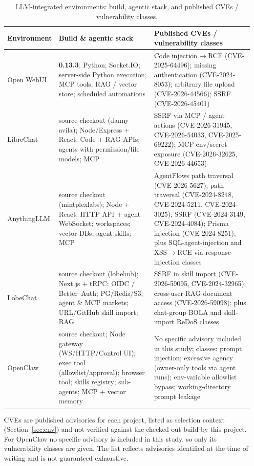 \documentclass[11pt,a4paper]{article}
\begin{document}
\begin{table}[htbp]\centering\footnotesize
\caption{LLM-integrated environments: build, agentic stack, and published CVEs /
vulnerability classes.}\label{tab:envllm}
\begin{tabularx}{\textwidth}{@{}l>{\raggedright\arraybackslash}X>{\raggedright\arraybackslash}X@{}}
\toprule
\textbf{Environment} & \textbf{Build \& agentic stack} & \textbf{Published CVEs / vulnerability classes}\\
\midrule
Open WebUI  & \textbf{0.13.3}; Python; Socket.IO; server-side Python execution; MCP tools; RAG / vector store; scheduled automations & Code injection$\to$RCE (CVE-2025-64496); missing authentication (CVE-2024-8053); arbitrary file upload (CVE-2026-44566); SSRF (CVE-2026-45401)\\
LibreChat   & source checkout (danny-avila); Node/Express + React; Code + RAG APIs; agents with permission/file models; MCP & SSRF via MCP / agent actions (CVE-2026-31945, CVE-2026-54033, CVE-2025-69222); MCP env/secret exposure (CVE-2026-32625, CVE-2026-44653)\\
AnythingLLM & source checkout (mintplexlabs); Node + React; HTTP API + agent WebSocket; workspaces; vector DBs; agent skills; MCP & AgentFlows path traversal (CVE-2026-5627); path traversal (CVE-2024-8248, CVE-2024-5211, CVE-2024-3025); SSRF (CVE-2024-3149, CVE-2024-4084); Prisma injection (CVE-2024-8251); plus SQL-agent-injection and XSS$\to$RCE-via-response-injection classes\\
LobeChat    & source checkout (lobehub); Next.js + tRPC; OIDC / Better~Auth; PG/Redis/S3; agent \& MCP markets; URL/GitHub skill import; RAG & SSRF in skill import (CVE-2026-59095, CVE-2024-32965); cross-user RAG document access (CVE-2026-59098); plus chat-group BOLA and skill-import ReDoS classes\\
OpenClaw    & source checkout; Node gateway (WS/HTTP/Control UI); exec tool (allowlist/approval); browser tool; skills registry; sub-agents; MCP + vector memory & No specific advisory included in this study; classes: prompt injection; excessive agency (owner-only tools via agent runs); env-variable allowlist bypass; working-directory prompt leakage\\
\bottomrule
\end{tabularx}

{\footnotesize CVEs are published advisories for each project, listed as selection context
(Section~\ref{sec:env}) and not verified against the checked-out build by this project. For
OpenClaw no specific advisory is included in this study, so only its vulnerability classes are
given. The list reflects advisories identified at the time of writing and is not guaranteed
exhaustive.}
\end{table}
\end{document}
